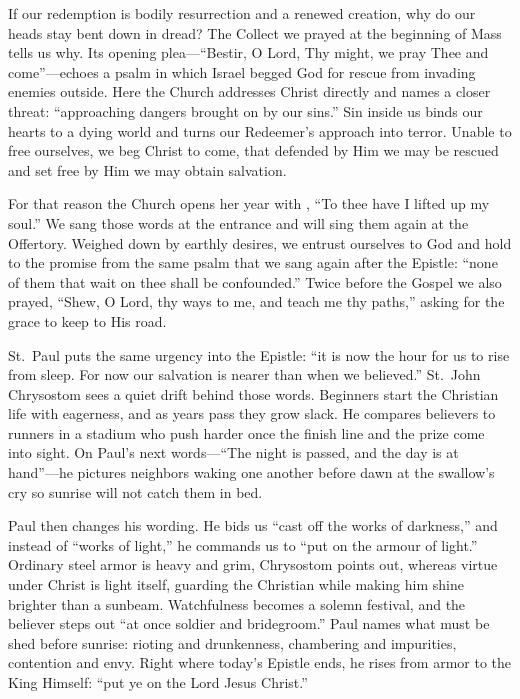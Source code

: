 If our redemption is bodily resurrection and a renewed creation, why do our heads stay bent down in dread? The Collect we prayed at the beginning of Mass tells us why. Its opening plea---``Bestir, O Lord, Thy might, we pray Thee and come''---echoes a psalm in which Israel begged God for rescue from invading enemies outside. Here the Church addresses Christ directly and names a closer threat: ``approaching dangers brought on by our sins.'' Sin inside us binds our hearts to a dying world and turns our Redeemer's approach into terror. Unable to free ourselves, we beg Christ to come, that defended by Him we may be rescued and set free by Him we may obtain salvation.

For that reason the Church opens her year with , ``To thee have I lifted up my soul.'' We sang those words at the entrance and will sing them again at the Offertory. Weighed down by earthly desires, we entrust ourselves to God and hold to the promise from the same psalm that we sang again after the Epistle: ``none of them that wait on thee shall be confounded.'' Twice before the Gospel we also prayed, ``Shew, O Lord, thy ways to me, and teach me thy paths,'' asking for the grace to keep to His road.

St.~Paul puts the same urgency into the Epistle: ``it is now the hour for us to rise from sleep. For now our salvation is nearer than when we believed.'' St.~John Chrysostom sees a quiet drift behind those words. Beginners start the Christian life with eagerness, and as years pass they grow slack. He compares believers to runners in a stadium who push harder once the finish line and the prize come into sight. On Paul's next words---``The night is passed, and the day is at hand''---he pictures neighbors waking one another before dawn at the swallow's cry so sunrise will not catch them in bed.

Paul then changes his wording. He bids us ``cast off the works of darkness,'' and instead of ``works of light,'' he commands us to ``put on the armour of light.'' Ordinary steel armor is heavy and grim, Chrysostom points out, whereas virtue under Christ is light itself, guarding the Christian while making him shine brighter than a sunbeam. Watchfulness becomes a solemn festival, and the believer steps out ``at once soldier and bridegroom.'' Paul names what must be shed before sunrise: rioting and drunkenness, chambering and impurities, contention and envy. Right where today's Epistle ends, he rises from armor to the King Himself: ``put ye on the Lord Jesus Christ.''

